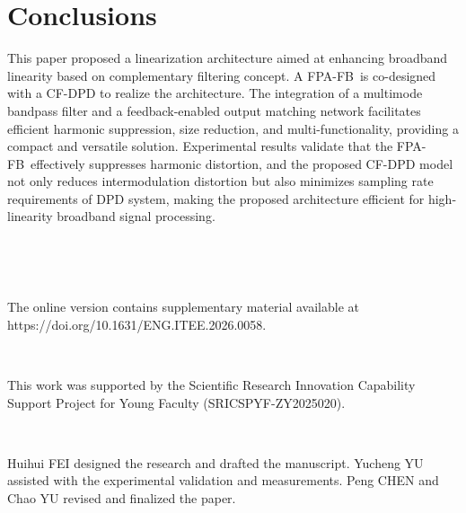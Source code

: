 \documentclass[twoside,twocolumn]{article}
\DeclareRobustCommand{\FPAFB}{FPA-FB}
\begin{document}
\section{Conclusions} \label{}
This paper proposed a linearization architecture aimed at enhancing broadband linearity based on complementary filtering concept. A \FPAFB\ is co-designed with a CF-DPD to realize the architecture. The integration of a multimode bandpass filter and a feedback-enabled output matching network facilitates efficient harmonic suppression, size reduction, and multi-functionality, providing a compact and versatile solution. Experimental results validate that the \FPAFB\ effectively suppresses harmonic distortion, and the proposed CF-DPD model not only reduces intermodulation distortion but also minimizes sampling rate requirements of DPD system, making the proposed architecture efficient for high-linearity broadband signal processing.




~

~


{\small The online version contains supplementary material available at https://doi.org/10.1631/ENG.ITEE.2026.0058.}

~


{\small This work was supported by the Scientific Research Innovation Capability Support Project for Young Faculty (SRICSPYF-ZY2025020).}

~


{\small Huihui FEI designed the research and drafted the manuscript. Yucheng YU assisted with the experimental validation and measurements. Peng CHEN and Chao YU revised and finalized the paper.}

~
\end{document}
